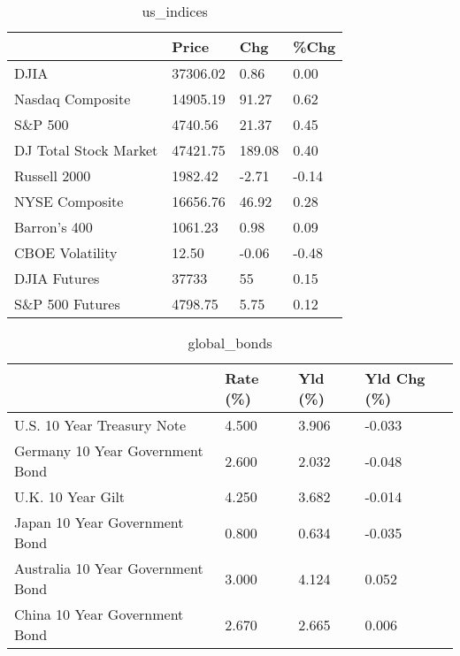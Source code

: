 \documentclass{article}%
\begin{document}
%


\begin{table}[htbp]%
\caption{us\_indices}%
\centering%
\begin{adjustbox}{width=1\textwidth}%
\begin{tabular}{llll}
\toprule
                      &    Price &    Chg &  \%Chg \\
\midrule
                 DJIA & 37306.02 &   0.86 &  0.00 \\
     Nasdaq Composite & 14905.19 &  91.27 &  0.62 \\
              S\&P 500 &  4740.56 &  21.37 &  0.45 \\
DJ Total Stock Market & 47421.75 & 189.08 &  0.40 \\
         Russell 2000 &  1982.42 &  -2.71 & -0.14 \\
       NYSE Composite & 16656.76 &  46.92 &  0.28 \\
         Barron's 400 &  1061.23 &   0.98 &  0.09 \\
      CBOE Volatility &    12.50 &  -0.06 & -0.48 \\
         DJIA Futures &    37733 &     55 &  0.15 \\
      S\&P 500 Futures &  4798.75 &   5.75 &  0.12 \\
\bottomrule
\end{tabular}
%
\end{adjustbox}%
\end{table}

%


\begin{table}[htbp]%
\caption{global\_bonds}%
\centering%
\begin{adjustbox}{width=1\textwidth}%
\begin{tabular}{llll}
\toprule
                                  & Rate (\%) & Yld (\%) & Yld Chg (\%) \\
\midrule
       U.S. 10 Year Treasury Note &    4.500 &   3.906 &      -0.033 \\
  Germany 10 Year Government Bond &    2.600 &   2.032 &      -0.048 \\
                U.K. 10 Year Gilt &    4.250 &   3.682 &      -0.014 \\
    Japan 10 Year Government Bond &    0.800 &   0.634 &      -0.035 \\
Australia 10 Year Government Bond &    3.000 &   4.124 &       0.052 \\
    China 10 Year Government Bond &    2.670 &   2.665 &       0.006 \\
\bottomrule
\end{tabular}
%
\end{adjustbox}%
\end{table}
\end{document}
